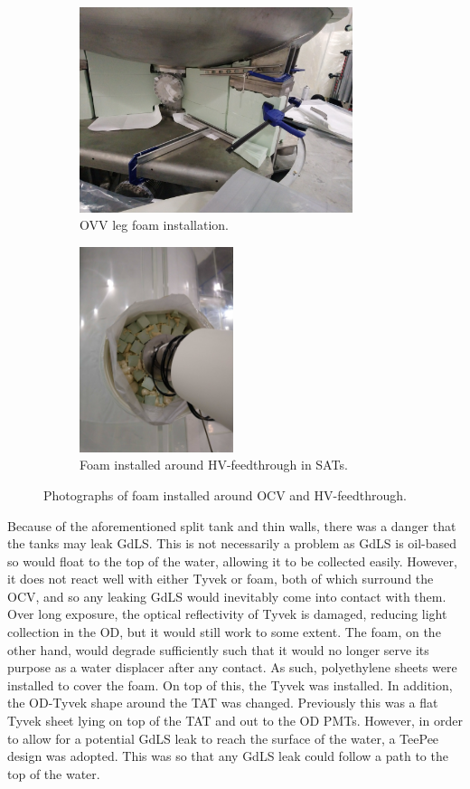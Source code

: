 \begin{figure}[!tbph]
\centering
\begin{subfigure}{.5\textwidth}
  \centering
  \includegraphics[height=6cm, width=\linewidth]{Figures/Construction/BAT_green_foam.JPG}
  \caption{OVV leg foam installation.}
  \label{fig:ocv_leg_foam}
  \end{subfigure}
  \begin{subfigure}{.5\textwidth}
  \centering
  \includegraphics[height=6cm, width=\linewidth]{Figures/Construction/HV_foam.jpg}
  \caption{Foam installed around HV-feedthrough in SATs.}
  \label{fig:hv_port_foam}
  \end{subfigure}
\caption{Photographs of foam installed around OCV and HV-feedthrough.}
\label{fig:Additional_foam_installation}
\end{figure}

\par
Because of the aforementioned split tank and thin walls, there was a danger that the tanks may leak GdLS.
This is not necessarily a problem as GdLS is oil-based so would float to the top of the water, allowing it to be collected easily.
However, it does not react well with either Tyvek or foam, both of which surround the OCV, and so any leaking GdLS would inevitably come into contact with them.
Over long exposure, the optical reflectivity of Tyvek is damaged, reducing light collection in the OD, but it would still work to some extent.
The foam, on the other hand, would degrade sufficiently such that it would no longer serve its purpose as a water displacer after any contact.
As such, polyethylene sheets were installed to cover the foam.
On top of this, the Tyvek was installed.
In addition, the OD-Tyvek shape around the TAT was changed.
Previously this was a flat Tyvek sheet lying on top of the TAT and out to the OD PMTs.
However, in order to allow for a potential GdLS leak to reach the surface of the water, a TeePee design was adopted.
This was so that any GdLS leak could follow a path to the top of the water.

